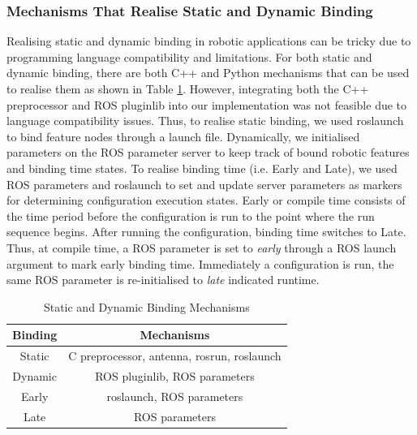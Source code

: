 \subsubsection{Mechanisms That Realise Static and Dynamic Binding}
Realising static and dynamic binding in robotic applications can be tricky due to programming language compatibility and limitations. For both static and dynamic binding, there are both C++ and Python mechanisms that can be used to realise them as shown in Table \ref{tab:realmecha}. However, integrating both the C++ preprocessor and ROS pluginlib into our implementation was not feasible due to language compatibility issues. Thus, to realise static binding, we used roslaunch to bind feature nodes through a launch file. Dynamically, we initialised parameters on the ROS parameter server to keep track of bound robotic features and binding time states. To realise binding time (i.e. Early and Late), we used ROS parameters and roslaunch to set and update server parameters as markers for determining configuration execution states. Early or compile time consists of the time period before the configuration is run to the point where the run sequence begins. After running the configuration, binding time switches to Late. Thus, at compile time, a ROS parameter is set to \textit{early} through a ROS launch argument to mark early binding time. Immediately a configuration is run, the same ROS parameter is re-initialised to \textit{late} indicated runtime.

\begin{table}[htbp]
\caption{Static and Dynamic Binding Mechanisms}
\begin{center}
\begin{tabular}{|c|c|}
\hline
    Binding & Mechanisms  \\ \hline
    Static & C preprocessor, antenna, rosrun, roslaunch \\ \hline
    Dynamic &  ROS pluginlib, ROS parameters  \\ \hline
    Early &  roslaunch, ROS parameters  \\ \hline
    Late &  ROS parameters  \\ \hline
\end{tabular}
\label{tab:realmecha}
\end{center}
\end{table}